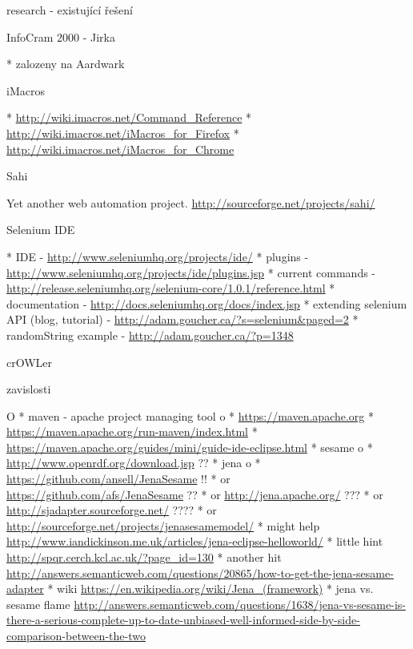 \chap research - existující řešení


\sec InfoCram 2000 - Jirka

\begitems
  * zalozeny na Aardwark 
\enditems


\sec iMacros

\begitems
  * \url{http://wiki.imacros.net/Command_Reference}
  * \url{http://wiki.imacros.net/iMacros_for_Firefox}
  * \url{http://wiki.imacros.net/iMacros_for_Chrome}
\enditems


\sec Sahi

Yet another web automation project. \url{http://sourceforge.net/projects/sahi/}


\sec Selenium IDE

\begitems
  * IDE - \url{http://www.seleniumhq.org/projects/ide/}
  * plugins - \url{http://www.seleniumhq.org/projects/ide/plugins.jsp}
  * current commands - \url{http://release.seleniumhq.org/selenium-core/1.0.1/reference.html}
  * documentation - \url{http://docs.seleniumhq.org/docs/index.jsp}
  * extending selenium API (blog, tutorial) - \url{http://adam.goucher.ca/?s=selenium&paged=2}
  \begitems
    * randomString example - \url{http://adam.goucher.ca/?p=1348}
  \enditems
\enditems






\chap crOWLer

\sec zavislosti

\begitems \style O
  * maven - apache project managing tool
  \begitems \style o
    * \url{https://maven.apache.org}
    * \url{https://maven.apache.org/run-maven/index.html}
    * \url{https://maven.apache.org/guides/mini/guide-ide-eclipse.html}
  \enditems
  * sesame
  \begitems \style o
    * \url{http://www.openrdf.org/download.jsp} ??
  \enditems
  * jena
  \begitems \style o
    * \url{https://github.com/ansell/JenaSesame} !!
    * or \url{https://github.com/afs/JenaSesame} ??
    * or \url{http://jena.apache.org/} ???
    * or \url{http://sjadapter.sourceforge.net/} ????
    * or \url{http://sourceforge.net/projects/jenasesamemodel/}
    * might help \url{http://www.iandickinson.me.uk/articles/jena-eclipse-helloworld/}
    * little hint \url{http://spqr.cerch.kcl.ac.uk/?page_id=130}
    * another hit \url{http://answers.semanticweb.com/questions/20865/how-to-get-the-jena-sesame-adapter}
    * wiki \url{https://en.wikipedia.org/wiki/Jena_(framework)}
    * jena vs. sesame flame \url{http://answers.semanticweb.com/questions/1638/jena-vs-sesame-is-there-a-serious-complete-up-to-date-unbiased-well-informed-side-by-side-comparison-between-the-two}
  \enditems
\enditems


